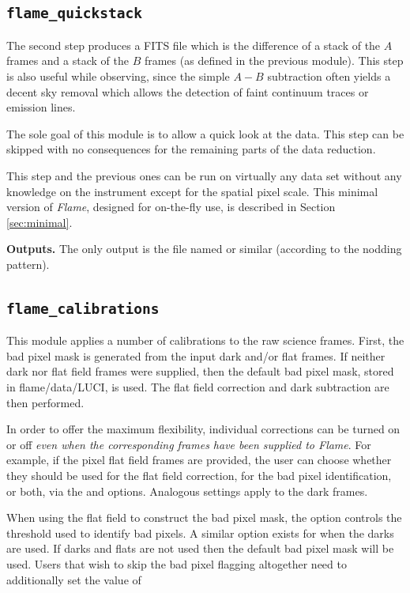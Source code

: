 \documentclass[a4paper]{article}
\newcommand{\flame}{\emph{Flame}}
\begin{document}
\begin{sloppypar}
\subsection{\texttt{flame\_quickstack}}
\label{sec:quickstack}

The second step produces a FITS file which is the difference of a stack of the $A$ frames and a stack of the $B$ frames (as defined in the previous module). This step is also useful while observing, since the simple $A-B$ subtraction often yields a decent sky removal which allows the detection of faint continuum traces or emission lines.

The sole goal of this module is to allow a quick look at the data. This step can be skipped with no consequences for the remaining parts of the data reduction.

This step and the previous ones can be run on virtually any data set without any knowledge on the instrument except for the spatial pixel scale. This minimal version of \flame, designed for on-the-fly use, is described in Section \ref{sec:minimal}.

\medskip
\noindent
\textbf{Outputs.} The only output is the file named  or similar (according to the nodding pattern).


\subsection{\texttt{flame\_calibrations}}
\label{sec:calibrations}

This module applies a number of calibrations to the raw science frames. First, the bad pixel mask is generated from the input dark and/or flat frames. If neither dark nor flat field frames were supplied, then the default bad pixel mask, stored in flame/data/LUCI, is used. The flat field correction and dark subtraction are then performed.

In order to offer the maximum flexibility, individual corrections can be turned on or off \emph{even when the corresponding frames have been supplied to \flame}. For example, if the pixel flat field frames are provided, the user can choose whether they should be used for the flat field correction, for the bad pixel identification, or both, via the  and  options. Analogous settings apply to the dark frames.

When using the flat field to construct the bad pixel mask, the option  controls the threshold used to identify bad pixels. A similar option exists for when the darks are used. If darks and flats are not used then the default bad pixel mask will be used. Users that wish to skip the bad pixel flagging altogether need to additionally set the value of 


\end{sloppypar}
\end{document}
